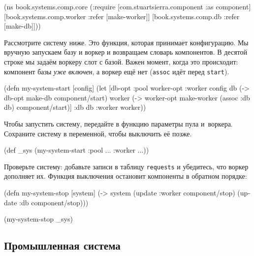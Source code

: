 \begin{english}
  \begin{clojure}
(ns book.systems.comp.core
  (:require
   [com.stuartsierra.component :as component]
   [book.systems.comp.worker :refer [make-worker]]
   [book.systems.comp.db :refer [make-db]]))
  \end{clojure}
\end{english}

Рассмотрите систему ниже. Это функция, которая принимает конфигурацию. Мы
вручную запускаем базу и воркер и возвращаем словарь компонентов. В десятой
строке мы задаём воркеру слот с базой. Важен момент, когда это происходит:
компонент базы \emph{уже включен}, а воркер ещё нет (\verb|assoc| идёт перед
\verb|start|).

\begin{english}
  \begin{clojure/lines}
(defn my-system-start
  [config]
  (let [{db-opt :pool
         worker-opt :worker} config
        db (-> db-opt
               make-db
               component/start)
        worker (-> worker-opt
                   make-worker
                   (assoc :db db)
                   component/start)]
    {:db db :worker worker}))
  \end{clojure/lines}
\end{english}

Чтобы запустить систему, передайте в функцию параметры пула и~воркера. Сохраните
систему в переменной, чтобы выключить её позже.

\begin{english}
  \begin{clojure}
(def _sys (my-system-start {:pool {...} :worker {...}}))
  \end{clojure}
\end{english}

Проверьте систему: добавьте записи в таблицу \verb|requests| и убедитесь, что
воркер дополняет их. Функция выключения остановит компоненты в обратном порядке:

\begin{english}
  \begin{clojure}
(defn my-system-stop
  [system]
  (-> system
      (update :worker component/stop)
      (update :db component/stop)))

(my-system-stop _sys)
  \end{clojure}
\end{english}

\subsection{Промышленная система}

